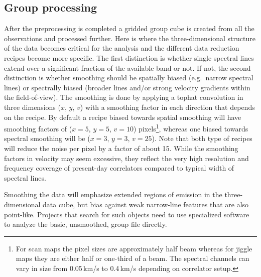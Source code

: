 \documentclass[final,authoryear,5p,times,twocolumn]{elsarticle}
\begin{document}
\subsection{Group processing}

After the preprocessing is completed a gridded group cube is created
from all the observations and processed further. Here is where the
three-dimensional structure of the data becomes critical for the analysis
and the different data reduction recipes become more specific. The first
distinction is whether single spectral lines extend over a significant
fraction of the available band or not. If not, the second distinction
is whether smoothing should be spatially biased (e.g.\ narrow spectral
lines) or spectrally biased (broader lines and/or strong velocity
gradients within the field-of-view). The smoothing is done by applying
a tophat convolution in three dimensions ($x$, $y$, $v$) with a smoothing
factor in each direction that depends on the recipe.  By default a
recipe biased towards spatial smoothing will have smoothing factors of
($x=5$, $y=5$, $v=10$) pixels\footnote{For scan maps the pixel sizes
  are approximately half beam whereas for jiggle maps they are either
  half or one-third of a beam. The spectral channels can vary in size
  from 0.05\,km/s to 0.4\,km/s depending on correlator setup.},
 whereas one biased towards spectral smoothing
will be ($x=3$, $y=3$, $v=25$). Note that both type of recipes will reduce
the noise per pixel by a factor of about 15. While the smoothing
factors in velocity may seem excessive, they reflect the very high
resolution and frequency coverage of present-day correlators
compared to typical width of spectral lines.

Smoothing the data will emphasize extended regions of emission in the
three-dimensional data cube, but bias against weak narrow-line features that are also
point-like. Projects that search for such objects need to use specialized
software to analyze the basic, unsmoothed, group file directly.
\end{document}
